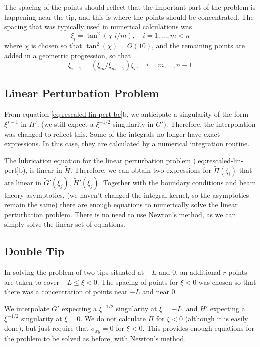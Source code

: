 \documentclass{jfm}
\begin{document}
The spacing of the points should reflect that the important part of the 
problem is happening near the tip, and this is where the points should be 
concentrated. The spacing that was typically used in numerical calculations 
was 
\begin{equation}
\xi_i = \tan^2( \chi \; i/m ), \quad i=1,\dots,m < n
\end{equation}
where $\chi$ is chosen so that $\tan^2(\chi) = O(10)$, and the remaining points
are added in a geometric progression, so that 
\begin{equation}
\xi_{i+1} = (\xi_m/\xi_{m-1})\xi_{i} , \quad i = m,\dots,n-1
\end{equation}
%
%
\subsection{Linear Perturbation Problem}
%
%
From equation \ref{eq:rescaled-lin-pert-bc}b, we anticipate a singularity of 
the form $\xi^{s-1}$ in $\tilde{H}'$, (we still expect a $\xi^{-1/2}$ 
singularity in $\tilde{G}'$). Therefore, the interpolation was changed to 
reflect this. Some of the integrals no longer have exact expressions. In this 
case, they are calculated by a numerical integration routine.

The lubrication equation for the linear perturbation problem 
(\ref{eq:rescaled-lin-pert}b), is linear in $\tilde{H}$. Therefore, we can
obtain two expressions for $\tilde{\Pi}(\zeta_i)$ that are linear in 
$\tilde{G}'(\xi_j)$, $\tilde{H}'(\xi_j)$. Together with the boundary 
conditions and beam theory asymptotics, (we haven't changed the integral 
kernel, so the asymptotics remain the same) there are enough equations to 
numerically solve the linear perturbation problem. There is no need to use 
Newton's method, as we can simply solve the linear set of equations.


\subsection{Double Tip}
In solving the problem of two tips situated at $-L$ and $0$, an additional 
$r$ points are taken to cover $-L \leq \xi < 0$. The spacing of points for 
$\xi<0$ was chosen so that there was a concentration of points near $-L$ and 
near $0$.

We interpolate $G'$ expecting a $\xi^{-1/2}$ singularity at $\xi = -L$, and
$H'$ expecting a $\xi^{-1/2}$ singularity at $\xi = 0$. We do not calculate 
$\Pi$ for $\xi <0$ (although it is easily done), but just require that
$\sigma_{xy} = 0$ for $\xi < 0$. This provides enough equations for the problem
to be solved as before, with Newton's method. 
\end{document}
